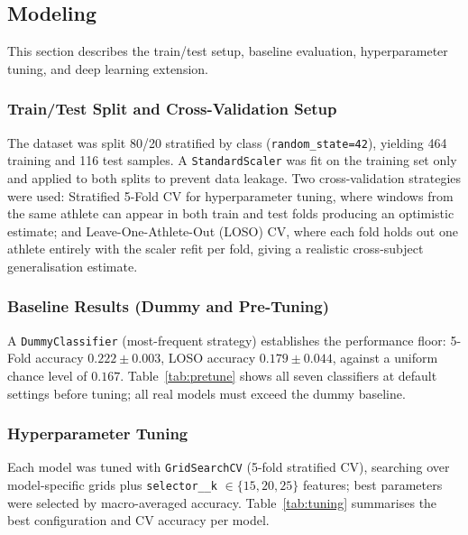 \documentclass[12pt,a4paper]{cibb}
\begin{document}
\subsection{Modeling}
\label{sec:MODEL}
This section describes the train/test setup, baseline evaluation, hyperparameter tuning, and deep learning extension.

\subsubsection{Train/Test Split and Cross-Validation Setup}
The dataset was split 80/20 stratified by class (\texttt{random\_state=42}), yielding 464 training and 116 test samples. A \texttt{StandardScaler} was fit on the training set only and applied to both splits to prevent data leakage. Two cross-validation strategies were used: Stratified 5-Fold CV for hyperparameter tuning, where windows from the same athlete can appear in both train and test folds producing an optimistic estimate; and Leave-One-Athlete-Out (LOSO) CV, where each fold holds out one athlete entirely with the scaler refit per fold, giving a realistic cross-subject generalisation estimate.

\subsubsection{Baseline Results (Dummy and Pre-Tuning)}
A \texttt{DummyClassifier} (most-frequent strategy) establishes the performance floor: 5-Fold accuracy $0.222 \pm 0.003$, LOSO accuracy $0.179 \pm 0.044$, against a uniform chance level of $0.167$. Table~\ref{tab:pretune} shows all seven classifiers at default settings before tuning; all real models must exceed the dummy baseline.

\begin{table}[H]
\centering
\small
{}
\caption{\textbf{Pre-tuning baseline results.} All seven classifiers at default settings.\label{tab:pretune}}
\end{table}

\subsubsection{Hyperparameter Tuning}
Each model was tuned with \texttt{GridSearchCV} (5-fold stratified CV), searching over model-specific grids plus \texttt{selector\_\_k} $\in \{15,20,25\}$ features; best parameters were selected by macro-averaged accuracy. Table~\ref{tab:tuning} summarises the best configuration and CV accuracy per model.
\end{document}
